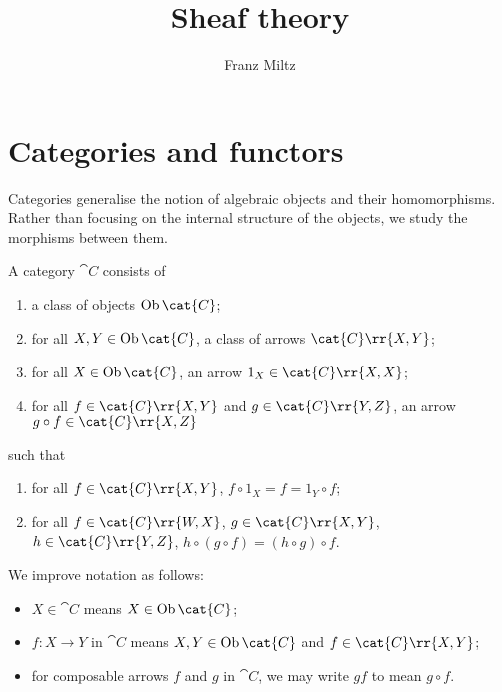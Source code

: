 \documentclass{article}
\author{Franz Miltz}
\title{Sheaf theory}
\begin{document}
\maketitle
\tableofcontents
\pagebreak

\printbibliography

\section{Categories and functors}\label{sec:categories_and_functors}

Categories generalise the notion of algebraic objects and their homomorphisms.
Rather than focusing on the internal structure of the objects, we study the
morphisms between them.

\begin{definition}[Category]\label{def:category}
  A category $\cat C$ consists of
  \begin{enumerate}
    \item a class of objects $\Ob\cat{C}$;
    \item for all $X,Y\in\Ob\cat{C}$, a class of arrows $\cat{C}\rr{X,Y}$;
    \item for all $X\in\Ob\cat{C}$, an arrow $1_X\in\cat{C}\rr{X,X}$;
    \item for all $f\in\cat{C}\rr{X,Y}$ and $g\in\cat{C}\rr{Y,Z}$, an arrow
      $g\circ f\in\cat{C}\rr{X,Z}$
  \end{enumerate}
  such that
  \begin{enumerate}
    \item for all $f\in\cat{C}\rr{X,Y}$, $f\circ 1_X = f = 1_Y\circ f$;
    \item for all $f\in\cat{C}\rr{W,X}$, $g\in\cat{C}\rr{X,Y}$, $h\in\cat{C}\rr{Y,Z}$,
      $h\circ(g\circ f)=(h\circ g)\circ f$.
  \end{enumerate}
\end{definition}

\begin{notation}
  We improve notation as follows:
  \begin{itemize}
    \item $X\in\cat{C}$ means $X\in\Ob\cat{C}$;
    \item $f:X\to Y$ in $\cat{C}$ means $X,Y\in\Ob\cat{C}$ and $f\in\cat{C}\rr{X,Y}$;
    \item for composable arrows $f$ and $g$ in $\cat{C}$, we may write $gf$ to mean $g\circ f$.
  \end{itemize}
\end{notation}
\end{document}
